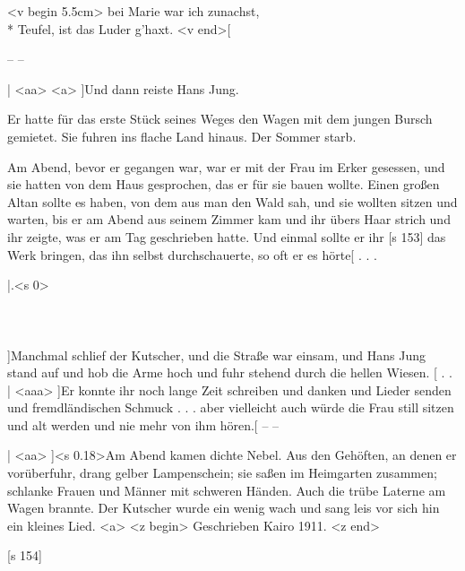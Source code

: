 <v begin 5.5cm>
bei Marie war ich zunachst,\\*
Teufel, ist das Luder g'haxt.
<v end>[

– –

|
<aa>
<a>
]Und dann reiste Hans Jung.

Er hatte für das erste Stück seines Weges den
Wagen mit dem jungen Bursch gemietet. Sie fuhren
ins flache Land hinaus. Der Sommer starb.

Am Abend, bevor er gegangen war, war er mit
der Frau im Erker gesessen, und sie hatten von
dem Haus gesprochen, das er für sie bauen wollte.
Einen großen Altan sollte es haben, von dem aus
man den Wald sah, und sie wollten sitzen und
warten, bis er am Abend aus seinem Zimmer kam
und ihr übers Haar strich und ihr zeigte, was er am
Tag geschrieben hatte. Und einmal sollte er ihr
[s 153]
das Werk bringen, das ihn selbst durchschauerte, so
oft er es hörte[ . . .

|.<s 0>
\\
\\
\\
\\
]Manchmal schlief der Kutscher, und die Straße
war einsam, und Hans Jung stand auf und hob die
Arme hoch und fuhr stehend durch die hellen Wiesen.
[
. . |
<aaa>
]Er konnte ihr noch lange Zeit schreiben und
danken und Lieder senden und fremdländischen
Schmuck . . . aber vielleicht auch würde die Frau
still sitzen und alt werden und nie mehr von ihm
hören.[ – –

|
<aa>
]<s 0.18>Am Abend kamen dichte Nebel. Aus den
Gehöften, an denen er vorüberfuhr, drang gelber
Lampenschein; sie saßen im Heimgarten zusammen;
schlanke Frauen und Männer mit schweren Händen.
Auch die trübe Laterne am Wagen brannte. Der
Kutscher wurde ein wenig wach und sang leis vor
sich hin ein kleines Lied.
<a>
<z begin>
Geschrieben Kairo 1911.
<z end>

[s 154]

